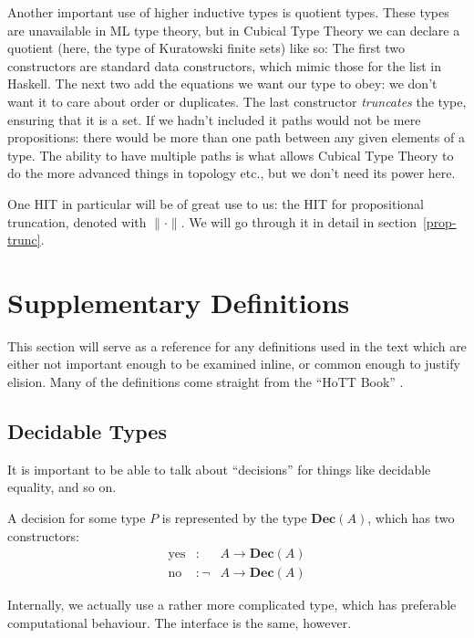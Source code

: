 \begin{subappendices}
Another important use of higher inductive types is quotient types.
These types are unavailable in ML type theory, but in Cubical Type Theory we can
declare a quotient (here, the type of Kuratowski finite sets) like so:
The first two constructors are standard data constructors, which mimic those for
the list in Haskell.
The next two add the equations we want our type to obey: we don't want it to
care about order or duplicates.
The last constructor \emph{truncates} the type, ensuring that it is a set.
If we hadn't included it paths would not be mere propositions: there would be
more than one path between any given elements of a type.
The ability to have multiple paths is what allows Cubical Type Theory to do the
more advanced things in topology etc., but we don't need its power here.

One HIT in particular will be of great use to us: the HIT for propositional
truncation, denoted with \(\lVert \cdot \rVert\).
We will go through it in detail in section~\ref{prop-trunc}.
\section{Supplementary Definitions}
This section will serve as a reference for any definitions used in the text
which are either not important enough to be examined inline, or common enough to
justify elision.
Many of the definitions come straight from the ``HoTT Book'' \cite{hottbook}.
\subsection{Decidable Types}
It is important to be able to talk about ``decisions'' for things like decidable
equality, and so on.
\begin{definition}[Decision]
  A decision for some type \(P\) is represented by the type \(\mathbf{Dec}(A)\),
  which has two constructors:
  \begin{equation}
    \begin{alignedat}{2}
      \text{yes} &:      &A \rightarrow \mathbf{Dec}(A) \\
      \text{no}  &: \neg &A \rightarrow \mathbf{Dec}(A)
    \end{alignedat}
  \end{equation}
\end{definition}

Internally, we actually use a rather more complicated type, which has preferable
computational behaviour.
The interface is the same, however.

\end{subappendices}

